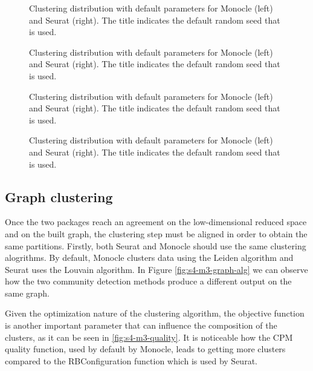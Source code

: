 \begin{figure}[H]
    \centering
    \caption{\label{fig:s4-m3-n-graph-type}Clustering distribution with default parameters for Monocle (left) and Seurat (right). The title indicates the default random seed that is used.}
\end{figure}

\begin{figure}[H]
    \centering
    \caption{\label{fig:s4-m3-snn-1}Clustering distribution with default parameters for Monocle (left) and Seurat (right). The title indicates the default random seed that is used.}
\end{figure}

\begin{figure}[H]
    \centering
    \caption{\label{fig:s4-m3-snn-2}Clustering distribution with default parameters for Monocle (left) and Seurat (right). The title indicates the default random seed that is used.}
\end{figure}

\begin{figure}[H]
    \centering
    \caption{\label{fig:s4-m3-snn-3}Clustering distribution with default parameters for Monocle (left) and Seurat (right). The title indicates the default random seed that is used.}
\end{figure}

\subsection{Graph clustering}
Once the two packages reach an agreement on the low-dimensional reduced space and on the built graph, the clustering step must be aligned in order to obtain the same partitions. Firstly, both Seurat and Monocle should use the same clustering alogrithms. By default, Monocle clusters data using the Leiden algorithm and Seurat uses the Louvain algorithm. In Figure \ref{fig:s4-m3-graph-alg} we can observe how the two community detection methods produce a different output on the same graph.

Given the optimization nature of the clustering algorithm, the objective function is another important parameter that can influence the composition of the clusters, as it can be seen in \ref{fig:s4-m3-quality}. It is noticeable how the CPM quality function, used by default by Monocle, leads to getting more clusters compared to the RBConfiguration function which is used by Seurat.

